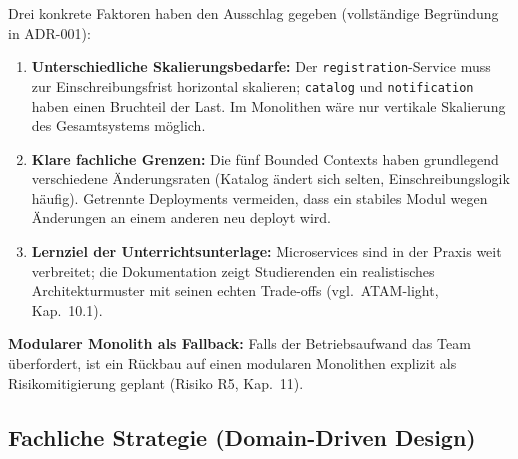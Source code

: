 \begin{hinweis}
Drei konkrete Faktoren haben den Ausschlag gegeben
(vollständige Begründung in ADR-001):
\begin{enumerate}[leftmargin=2em]
  \item \textbf{Unterschiedliche Skalierungsbedarfe:} Der
  \texttt{registration}-Service muss zur Einschreibungsfrist horizontal
  skalieren; \texttt{catalog} und \texttt{notification} haben einen
  Bruchteil der Last. Im Monolithen wäre nur vertikale Skalierung des
  Gesamtsystems möglich.
  \item \textbf{Klare fachliche Grenzen:} Die fünf Bounded Contexts haben
  grundlegend verschiedene Änderungsraten (Katalog ändert sich selten,
  Einschreibungslogik häufig). Getrennte Deployments vermeiden, dass ein
  stabiles Modul wegen Änderungen an einem anderen neu deployt wird.
  \item \textbf{Lernziel der Unterrichtsunterlage:} Microservices sind
  in der Praxis weit verbreitet; die Dokumentation zeigt Studierenden
  ein realistisches Architekturmuster mit seinen echten Trade-offs
  (vgl.\ ATAM-light, Kap.~10.1).
\end{enumerate}
\textbf{Modularer Monolith als Fallback:} Falls der Betriebsaufwand das
Team überfordert, ist ein Rückbau auf einen modularen Monolithen explizit
als Risikomitigierung geplant (Risiko R5, Kap.~11).
\end{hinweis}

\subsection{Fachliche Strategie (Domain-Driven Design)}

